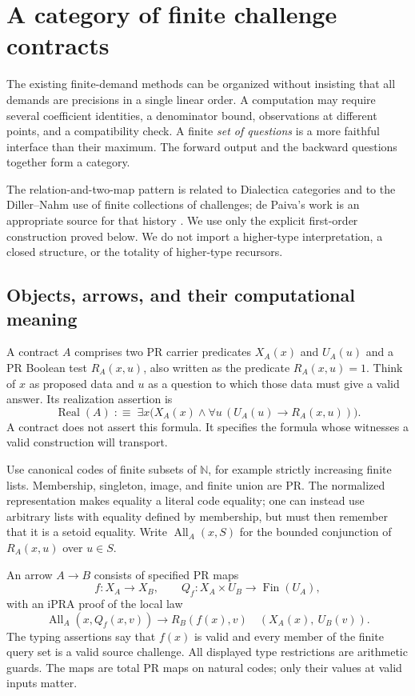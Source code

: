 \section{A category of finite challenge contracts}
\label{sec:challenge-category}

The existing finite-demand methods can be organized without insisting that
all demands are precisions in a single linear order.  A computation may require
several coefficient identities, a denominator bound, observations at different
points, and a compatibility check.  A finite \emph{set of questions} is a more
faithful interface than their maximum.  The forward output and the backward
questions together form a category.

The relation-and-two-map pattern is related to Dialectica categories and to the
Diller--Nahm use of finite collections of challenges; de Paiva's work is an
appropriate source for that history \cite{depaiva1991}.  We use only the explicit
first-order construction proved below.  We do not import a higher-type
interpretation, a closed structure, or the totality of higher-type recursors.

\subsection{Objects, arrows, and their computational meaning}

A contract $A$ comprises two PR carrier predicates $X_A(x)$ and $U_A(u)$ and a PR
Boolean test $R_A(x,u)$, also written as the predicate $R_A(x,u)=1$.
Think of $x$ as proposed data and $u$ as a question to
which those data must give a valid answer.  Its realization assertion is
\[
 \operatorname{Real}(A)\;:\equiv\;
 \exists x\bigl(X_A(x)\land
      \forall u\,(U_A(u)\to R_A(x,u))\bigr).
\]
A contract does not assert this formula.  It specifies the formula whose
witnesses a valid construction will transport.

Use canonical codes of finite subsets of $\mathbb N$, for example strictly
increasing finite lists.  Membership, singleton, image, and finite union are PR.
The normalized representation makes equality a literal code equality; one can
instead use arbitrary lists with equality defined by membership, but must then
remember that it is a setoid equality.  Write $\operatorname{All}_A(x,S)$ for the
bounded conjunction of $R_A(x,u)$ over $u\in S$.

An arrow $A\to B$ consists of specified PR maps
\[
 f:X_A\longrightarrow X_B,\qquad
 Q_f:X_A\times U_B\longrightarrow\operatorname{Fin}(U_A),
\]
with an iPRA proof of the local law
\[
 \operatorname{All}_A(x,Q_f(x,v))\longrightarrow R_B(f(x),v)
 \quad(X_A(x),\ U_B(v)).                              \tag{C}
\]
The typing assertions say that $f(x)$ is valid and every member of the finite
query set is a valid source challenge.  All displayed type restrictions are
arithmetic guards.  The maps are total PR maps on natural codes; only their
values at valid inputs matter.

